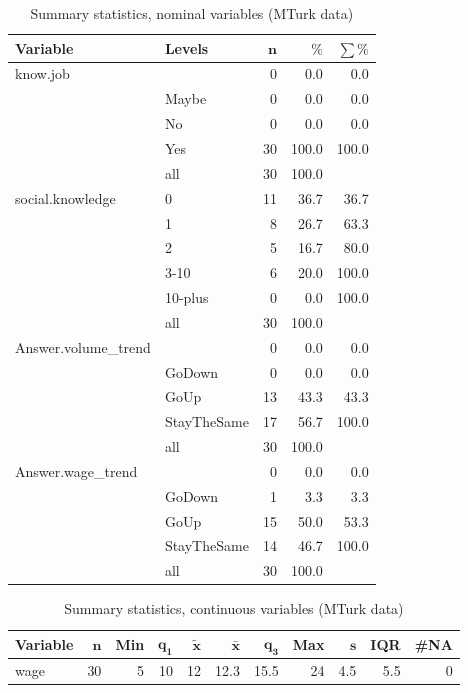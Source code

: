 \documentclass[a4paper,10pt]{article}\usepackage[]{graphicx}\usepackage[]{color}
\begin{document}
\begin{table}[ht]
\centering
{\footnotesize
\begin{tabular}{ll|rrr}
 \textbf{Variable} & \textbf{Levels} & $\mathbf{n}$ & $\mathbf{\%}$ & $\mathbf{\sum \%}$ \\ 
  \hline
know.job &  & 0 & 0.0 & 0.0 \\ 
   & Maybe & 0 & 0.0 & 0.0 \\ 
   & No & 0 & 0.0 & 0.0 \\ 
   & Yes & 30 & 100.0 & 100.0 \\ 
   \hline
 & all & 30 & 100.0 &  \\ 
   \hline
\hline
social.knowledge & 0 & 11 & 36.7 & 36.7 \\ 
   & 1 & 8 & 26.7 & 63.3 \\ 
   & 2 & 5 & 16.7 & 80.0 \\ 
   & 3-10 & 6 & 20.0 & 100.0 \\ 
   & 10-plus & 0 & 0.0 & 100.0 \\ 
   \hline
 & all & 30 & 100.0 &  \\ 
   \hline
\hline
Answer.volume\_trend &  & 0 & 0.0 & 0.0 \\ 
   & GoDown & 0 & 0.0 & 0.0 \\ 
   & GoUp & 13 & 43.3 & 43.3 \\ 
   & StayTheSame & 17 & 56.7 & 100.0 \\ 
   \hline
 & all & 30 & 100.0 &  \\ 
   \hline
\hline
Answer.wage\_trend &  & 0 & 0.0 & 0.0 \\ 
   & GoDown & 1 & 3.3 & 3.3 \\ 
   & GoUp & 15 & 50.0 & 53.3 \\ 
   & StayTheSame & 14 & 46.7 & 100.0 \\ 
   \hline
 & all & 30 & 100.0 &  \\ 
   \hline
\hline
\end{tabular}
}
\caption{Summary statistics, nominal variables (MTurk data)} 
\label{tab1:35-3010}
\end{table}
\begin{table}[ht]
\centering
{\footnotesize
\begin{tabular}{lrrrrrrrrrr}
 \textbf{Variable} & $\mathbf{n}$ & \textbf{Min} & $\mathbf{q_1}$ & $\mathbf{\widetilde{x}}$ & $\mathbf{\bar{x}}$ & $\mathbf{q_3}$ & \textbf{Max} & $\mathbf{s}$ & \textbf{IQR} & \textbf{\#NA} \\ 
  \hline
wage & 30 & 5 & 10 & 12 & 12.3 & 15.5 & 24 & 4.5 & 5.5 & 0 \\ 
  \end{tabular}
}
\caption{Summary statistics, continuous variables (MTurk data)} 
\label{tab2:35-3010}
\end{table}
\end{document}
